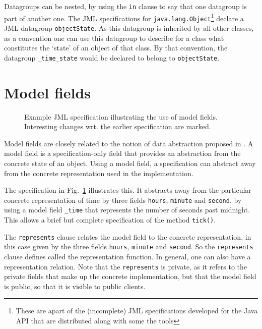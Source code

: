 \documentclass{llncs}
\begin{document}
Datagroups can be nested, by using the \texttt{in} clause to say that
one datagroup is part of another one. The JML specifications for
\texttt{java.lang.Object}\footnote{These are apart of the (incomplete) JML 
specifications developed for the Java API that are distributed along with 
some the tools} declare a JML datagroup \texttt{objectState}. As this datagroup
is inherited by all other classes, as a convention one can use this datagroup 
to describe for a class what constitutes the `state' of an object of that class.
By that convention, the datagroup \texttt{\_time\_state} would be declared
to belong to \texttt{objectState}.

\section{Model fields}
\label{Sec:model}


\begin{figure}[tbp] \label{Example:model}
%

%
\vspace*{-2ex} %
\caption{Example JML specification illustrating the use of model fields. Interesting changes wrt. the earlier specification are marked.}
\end{figure}


Model fields are closely related to the notion of data abstraction proposed in 
\cite{Hoare72}.  A model field is a specification-only field that provides an 
abstraction from the concrete state of an object.  Using a model field, a 
specification can abstract away from the concrete representation used in 
the implementation.

The specification in Fig.~\ref{Example:model} illustrates this.
It abstracts away from the particular concrete representation of time
by three fields \texttt{hours}, \texttt{minute} and \texttt{second},
by using a model field \texttt{\_time} that represents the number of seconds
past midnight.
This allows a brief but complete specification of the method \texttt{tick()}.

The \texttt{represents} clause relates the model field to the concrete representation,
in this case given by the three fields  \texttt{hours}, \texttt{minute} and 
\texttt{second}. So the \texttt{represents} clause defines called the 
representation function. In general, one can also have a representation relation.
Note that the \texttt{represents} is private, as it refers to the private
fields that make up the concrete implementation, but that the model field
is public, so that it is visible to public clients.
\end{document}
